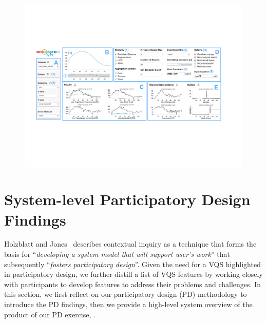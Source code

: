 \begin{figure}[ht!]
  \centering
  \vspace{-5pt}
  \includegraphics[width=0.95\linewidth]{figures/zvpp_system.pdf} %
  \vspace{-5pt}\caption{}
  \label{zvOverview}
  \vspace{-5pt}
\end{figure}
\section{System-level Participatory Design Findings\label{sec:pd_findings}}
Holzblatt and Jones~\cite{HoltzblattJones} describes contextual inquiry as a technique that forms the basis for ``\textit{developing a system model that will support user's work}'' that subsequently ``\textit{fosters participatory design}''. Given the need for a VQS highlighted in participatory design, we further distill a list of VQS features by working closely with participants to develop features to address their problems and challenges. In this section, we first reflect on our participatory design (PD) methodology
to introduce the PD findings, then we provide a high-level system overview of the product of our PD exercise, \zvpp.
